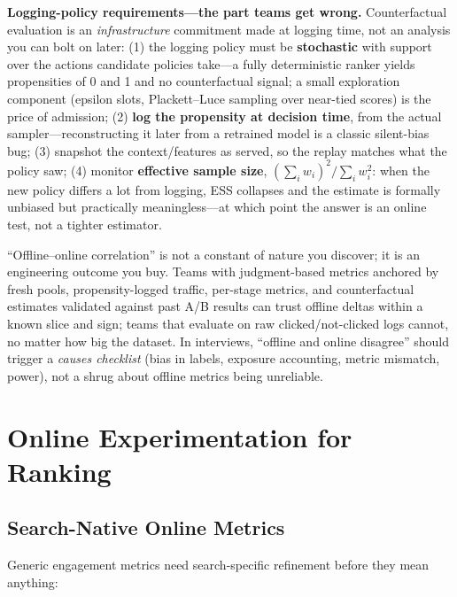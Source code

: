 \textbf{Logging-policy requirements---the part teams get wrong.} Counterfactual evaluation is an \textit{infrastructure} commitment made at logging time, not an analysis you can bolt on later: (1) the logging policy must be \textbf{stochastic} with support over the actions candidate policies take---a fully deterministic ranker yields propensities of 0 and 1 and no counterfactual signal; a small exploration component (epsilon slots, Plackett--Luce sampling over near-tied scores) is the price of admission; (2) \textbf{log the propensity at decision time}, from the actual sampler---reconstructing it later from a retrained model is a classic silent-bias bug; (3) snapshot the context/features as served, so the replay matches what the policy saw; (4) monitor \textbf{effective sample size}, $(\sum_i w_i)^2 / \sum_i w_i^2$: when the new policy differs a lot from logging, ESS collapses and the estimate is formally unbiased but practically meaningless---at which point the answer is an online test, not a tighter estimator.

\begin{keyinsight}
``Offline--online correlation'' is not a constant of nature you discover; it is an engineering outcome you buy. Teams with judgment-based metrics anchored by fresh pools, propensity-logged traffic, per-stage metrics, and counterfactual estimates validated against past A/B results can trust offline deltas within a known slice and sign; teams that evaluate on raw clicked/not-clicked logs cannot, no matter how big the dataset. In interviews, ``offline and online disagree'' should trigger a \textit{causes checklist} (bias in labels, exposure accounting, metric mismatch, power), not a shrug about offline metrics being unreliable.
\end{keyinsight}

\section{Online Experimentation for Ranking}
\label{sr:sec:eval_online}

\subsection{Search-Native Online Metrics}

Generic engagement metrics need search-specific refinement before they mean anything:

